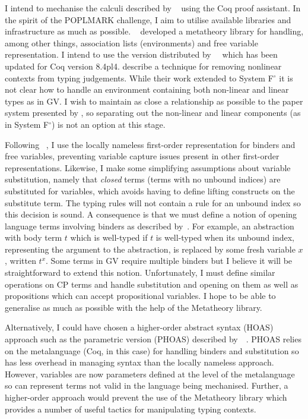 \documentclass{mprop}
\newcommand{\fpop}{System F${}^\circ$\xspace}
\begin{document}

I intend to mechanise the calculi described by
\citeauthor{Wadler:2014}~\cite{Wadler:2014} using the Coq proof assistant. In
the spirit of the POPLMARK challenge, I aim to utilise available libraries and
infrastructure as much as
possible. \citeauthor{Aydemir:2008:EFM}~\cite{Aydemir:2008:EFM} developed a
metatheory library for handling, among other things, association lists
(environments) and free variable representation. I intend to use the version
distributed by~\citeauthor{Park:2014:MMW}~\cite{Park:2014:MMW} which has been
updated for Coq version 8.4pl4. \citeauthor{Park:2014:MMW} describe a
technique for removing nonlinear contexts from typing judgements. While their
work extended to \fpop it is not clear how to handle an environment containing
both non-linear and linear types as in GV. I wish to maintain as close a
relationship as possible to the paper system presented by
\citeauthor{Wadler:2014}, so separating out the non-linear and linear
components (as in \fpop) is not an option at this stage.

Following \citeauthor{Aydemir:2008:EFM}~\cite{Aydemir:2008:EFM}, I use the
locally nameless first-order representation for binders and free variables,
preventing variable capture issues present in other first-order
representations. Likewise, I make some simplifying assumptions about variable
substitution, namely that \textit{closed} terms (terms with no unbound
indices) are substituted for variables, which avoids having to define lifting
constructs on the substitute term. The typing rules will not contain a rule
for an unbound index so this decision is sound. A consequence is that we must
define a notion of opening language terms involving binders as described
by~\citeauthor{Aydemir:2008:EFM}. For example, an abstraction with body term
$t$ which is well-typed if $t$ is well-typed when its unbound index,
representing the argument to the abstraction, is replaced by some fresh
variable $x$, written $t^x$. Some terms in GV require multiple binders but I
believe it will be straightforward to extend this notion. Unfortunately, I
must define similar operations on CP terms and handle substitution and opening
on them as well as propositions which can accept propositional variables. I
hope to be able to generalise as much as possible with the help of the
Metatheory library.

Alternatively, I could have chosen a higher-order abstract syntax (HOAS)
approach such as the parametric version (PHOAS) described
by~\citeauthor{Chlipala:2008:PHOAS}~\cite{Chlipala:2008:PHOAS}. PHOAS relies
on the metalanguage (Coq, in this case) for handling binders and substitution
so has less overhead in managing syntax than the locally nameless
approach. However, variables are now parameters defined at the level of the
metalanguage so can represent terms not valid in the language being
mechanised. Further, a higher-order approach would prevent the use of the
Metatheory library which provides a number of useful tactics for manipulating
typing contexts.
\end{document}
